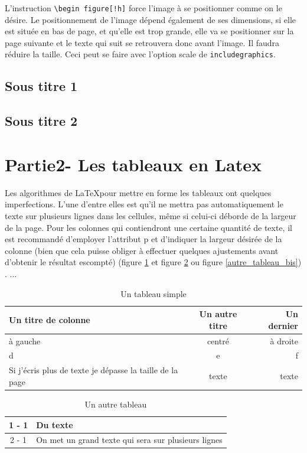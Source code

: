 \documentclass[a4paper,12pt]{article}
\begin{document}
L’instruction \texttt{\textbackslash begin figure[!h]} force l’image à se positionner comme on le désire. Le positionnement de l’image dépend également de ses dimensions, si elle est située en bas de page, et qu’elle est trop grande, elle va se positionner sur la page suivante et le texte qui suit se retrouvera donc avant l’image.
Il faudra réduire la taille.
Ceci peut se faire avec l’option scale de \texttt{includegraphics}.

\subsection{Sous titre 1}
\subsection{Sous titre 2}

\section{Partie2- Les tableaux en Latex}

Les algorithmes de \LaTeX pour mettre en forme les tableaux ont quelques
imperfections. L’une d’entre elles est qu’il ne mettra pas automatiquement
le texte sur plusieurs lignes dans les cellules, même si celui-ci déborde de la
largeur de la page. Pour les colonnes qui contiendront une certaine quantité
de texte, il est recommandé d’employer l’attribut p et d’indiquer la largeur
désirée de la colonne (bien que cela puisse obliger à effectuer quelques ajustements avant d’obtenir le résultat escompté) (figure \ref{tableau_simple} et figure \ref{autre_tableau} ou figure \ref{autre_tableau_bis}) \cite{wikibooks} \cite{wikibooks}. ...

\begin{table}[h]
    \centering
    \begin{tabular}{|l|c|r|}
	\hline
	Un titre de colonne & Un autre titre & Un dernier \\
	\hline
	à gauche & centré & à droite \\
	\hline
	d & e & f \\
	\hline
	Si j’écris plus de texte je dépasse la taille de la page & texte & texte \\
	\hline
    \end{tabular}
    \caption{Un tableau simple}
    \label{tableau_simple}
\end{table}

\begin{table}[h]
    \centering
    \begin{tabular}{|c|p{3cm}|}
	\hline
	1 - 1 & Du texte \\
	\hline
	2 - 1 & On met un grand texte qui sera sur plusieurs lignes \\
	\hline
    \end{tabular}
    \caption{Un autre tableau}
    \label{autre_tableau}
\end{table}
\end{document}

